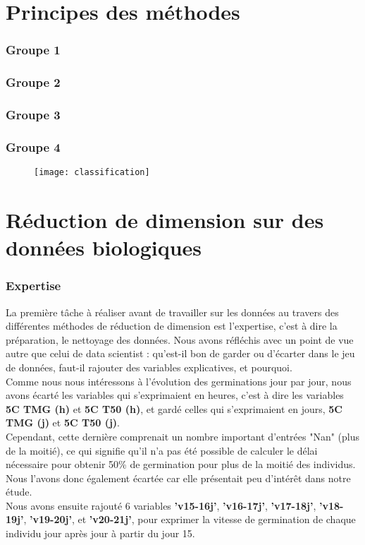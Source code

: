 \documentclass[12pt]{report}
\begin{document}
\part{Principes des méthodes}

\section{Groupe 1}

\section{Groupe 2}

\section{Groupe 3}

\section{Groupe 4}

\begin{figure}[H] 
\centerline{\texttt{[image: classification]}}
\end{figure}


\part{Réduction de dimension sur des données biologiques}

\section{Expertise}

La première tâche à réaliser avant de travailler sur les données au travers des différentes méthodes de réduction de dimension est l'expertise, c'est à dire la préparation, le nettoyage des données. Nous avons réfléchis avec un point de vue
autre que celui de data scientist : qu'est-il bon de garder ou d'écarter dans le jeu de données, faut-il rajouter des variables explicatives, et pourquoi.\\

Comme nous nous intéressons à l'évolution des germinations jour par jour, nous avons écarté les variables qui s'exprimaient en heures, c'est à dire les variables \textbf{5\textdegree C TMG (h)} et \textbf{5\textdegree C T50 (h)}, et gardé celles qui s'exprimaient en jours, \textbf{5\textdegree C TMG (j)} et \textbf{5\textdegree C T50 (j)}.\\
Cependant, cette dernière comprenait un nombre important d'entrées "Nan" (plus de la moitié), ce qui signifie qu'il n'a pas été possible de calculer le délai nécessaire pour obtenir 50\% de germination pour plus de la moitié des individus. Nous l'avons donc également écartée car elle présentait peu d'intérêt dans notre étude.\\

Nous avons ensuite rajouté 6 variables \textbf{'v15-16j'}, \textbf{'v16-17j'}, \textbf{'v17-18j'}, \textbf{'v18-19j'}, \textbf{'v19-20j'}, et \textbf{'v20-21j'},  pour exprimer la vitesse de germination de chaque individu jour après jour à partir du jour 15.
\end{document}
